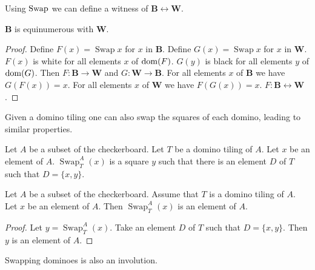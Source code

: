 \documentclass[english]{article}
\newcommand{\Black}{\mathbf{B}}
\newcommand{\White}{\mathbf{W}}
\newcommand{\Swap}[1]{\operatorname{Swap}#1}
\newcommand{\Sw}[3]{\operatorname{Swap}_{#1}^{#2}(#3)}
\begin{document}
Using $\Swap$ we can define a witness of $\Black \leftrightarrow \White$.

\begin{forthel}
    \begin{lemma}
        $\Black$ is equinumerous with $\White$.
    \end{lemma}
    \begin{proof}
        Define $F(x) = \Swap{x}$ for $x$ in $\Black$.
        Define $G(x) = \Swap{x}$ for $x$ in $\White$.
        $F(x)$ is white for all elements $x$ of $\operatorname{dom}(F)$.
        $G(y)$ is black for all elements $y$ of $\operatorname{dom}(G)$.
        Then $F : \Black \to \White$ and $G : \White \to \Black$.
        For all elements $x$ of $\Black$ we have $G(F(x)) = x$.
        For all elements $x$ of $\White$ we have $F(G(x)) = x$.
        $F : \Black \leftrightarrow \White$.
    \end{proof}
\end{forthel}

Given a domino tiling one can also swap the squares of each domino,
leading to similar properties.

\begin{forthel}
    \begin{signature}
        Let $A$ be a subset of the checkerboard.
        Let $T$ be a domino tiling of $A$.
        Let $x$ be an element of $A$.
        $\Sw{T}{A}{x}$ is a square $y$ such that there is an element $D$ of $T$
        such that $D = \{x,y\}$.
    \end{signature}

    \begin{lemma}
        Let $A$ be a subset of the checkerboard.
        Assume that $T$ is a domino tiling of $A$.
        Let $x$ be an element of $A$.
        Then $\Sw{T}{A}{x}$ is an element of $A$.
    \end{lemma}
    \begin{proof}
        Let $y = \Sw{T}{A}{x}$.
        Take an element $D$ of $T$ such that $D = \{x,y\}$.
        Then $y$ is an element of $A$.
    \end{proof}
\end{forthel}


Swapping dominoes is also an involution.
\end{document}
